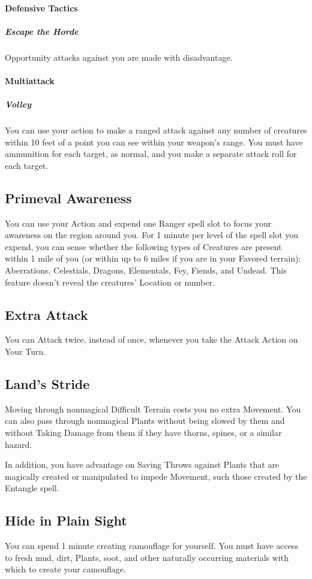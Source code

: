 \documentclass[letterpaper,openany,oneside,twocolumn]{book}
\begin{document}
\paragraph*{Defensive Tactics}
\subparagraph*{Escape the Horde}
Opportunity attacks against you are made with disadvantage.
\paragraph*{Multiattack}
\subparagraph*{Volley}
You can use your action to make a ranged attack against any number of creatures within 10 feet of a point you can see within your weapon's range. You must have ammunition for each target, as normal, and you make a separate attack roll for each target.

\subsection*{Primeval Awareness}
You can use your Action and expend one Ranger spell slot to focus your awareness on the region around you. For 1 minute per level of the spell slot you expend, you can sense whether the following types of Creatures are present within 1 mile of you (or within up to 6 miles if you are in your Favored terrain): Aberrations, Celestials, Dragons, Elementals, Fey, Fiends, and Undead. This feature doesn't reveal the creatures' Location or number.

\subsection*{Extra Attack}
You can Attack twice, instead of once, whenever you take the Attack Action on Your Turn.

\subsection*{Land's Stride}
Moving through nonmagical Difficult Terrain costs you no extra Movement. You can also pass through nonmagical Plants without being slowed by them and without Taking Damage from them if they have thorns, spines, or a similar hazard.

In addition, you have advantage on Saving Throws against Plants that are magically created or manipulated to impede Movement, such those created by the Entangle spell.

\subsection*{Hide in Plain Sight}
You can spend 1 minute creating camouflage for yourself. You must have access to fresh mud, dirt, Plants, soot, and other naturally occurring materials with which to create your camouflage.
\end{document}
